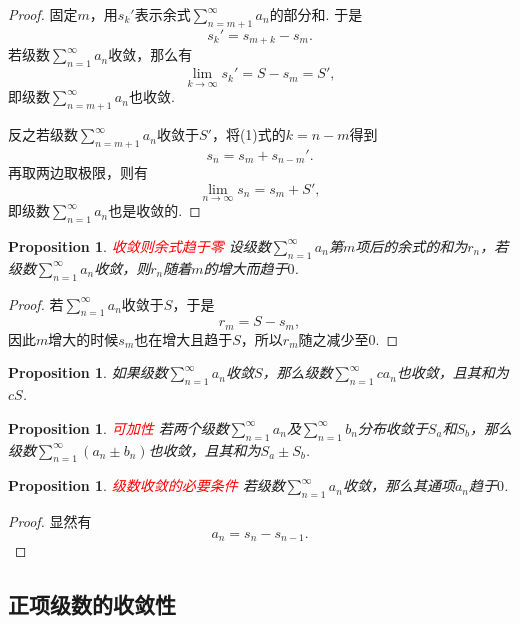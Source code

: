 \documentclass{article}
\newtheorem{proposition}[theorem]{Proposition}
\newcommand{\redt}[1]{\textcolor{red}{#1}}
\begin{document}
\begin{proof}
\rm 固定$m$，用$s_k'$表示余式$\sum\limits_{n=m+1}^\infty a_n$的部分和. 于是
\begin{equation}
s_k' = s_{m+k} - s_m.
\end{equation}
若级数$\sum\limits_{n=1}^\infty a_n$收敛，那么有
$$
\lim\limits_{k \to \infty}s_k' = S-s_m = S',
$$
即级数$\sum\limits_{n=m+1}^\infty a_n$也收敛. 

反之若级数$\sum\limits_{n=m+1}^\infty a_n$收敛于$S'$，将(1)式的$k=n-m$得到
$$
s_n = s_m + s_{n-m}'.
$$
再取两边取极限，则有
$$
\lim\limits_{n \to \infty} s_n  = s_m + S',
$$
即级数$\sum\limits_{n=1}^\infty a_n$也是收敛的. 
\end{proof}

\begin{proposition}
\rm \redt{收敛则余式趋于零} 设级数$\sum\limits_{n=1}^\infty a_n$第$m$项后的余式的和为$r_n$，若级数$\sum\limits_{n=1}^\infty a_n$收敛，则$r_n$随着$m$的增大而趋于$0$.
\end{proposition}

\begin{proof}
若$\sum\limits_{n=1}^\infty a_n$收敛于$S$，于是
$$
r_m = S - s_m,
$$
因此$m$增大的时候$s_m$也在增大且趋于$S$，所以$r_m$随之减少至$0$.
\end{proof}

\begin{proposition}
\rm 如果级数$\sum\limits_{n=1}^\infty a_n$收敛$S$，那么级数$\sum\limits_{n=1}^\infty ca_n$也收敛，且其和为$cS$. 
\end{proposition}


\begin{proposition}
\rm \redt{可加性} 若两个级数$\sum\limits_{n=1}^\infty a_n$及$\sum\limits_{n=1}^\infty b_n$分布收敛于$S_a$和$S_b$，那么级数$\sum\limits_{n=1}^\infty (a_n \pm b_n)$也收敛，且其和为$S_a \pm S_b$.
\end{proposition}

\begin{proposition}
\rm \redt{级数收敛的必要条件} 若级数$\sum\limits_{n=1}^\infty a_n$收敛，那么其通项$a_n$趋于$0$. 
\end{proposition}

\begin{proof}
显然有
$$
a_n = s_n - s_{n-1}.
$$
\end{proof}

\subsection{正项级数的收敛性}
\end{document}

